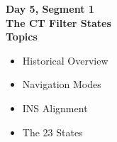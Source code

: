 \begin{frame}
\textbf{Day 5, Segment 1\\
The CT Filter States\\
Topics}
 \begin{itemize}
 \item Historical Overview
 \item Navigation Modes
 \item INS Alignment
 \item The 23 States
\end{itemize}
\end{frame}




%
